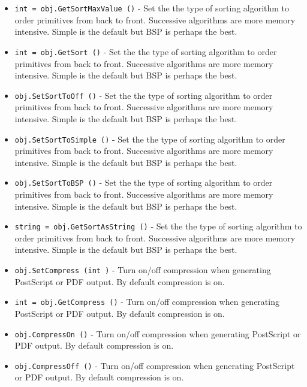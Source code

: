 \begin{itemize}
\item  \verb|int = obj.GetSortMaxValue ()| -  Set the the type of sorting algorithm to order primitives from
 back to front.  Successive algorithms are more memory
 intensive.  Simple is the default but BSP is perhaps the best.

\item  \verb|int = obj.GetSort ()| -  Set the the type of sorting algorithm to order primitives from
 back to front.  Successive algorithms are more memory
 intensive.  Simple is the default but BSP is perhaps the best.

\item  \verb|obj.SetSortToOff ()| -  Set the the type of sorting algorithm to order primitives from
 back to front.  Successive algorithms are more memory
 intensive.  Simple is the default but BSP is perhaps the best.

\item  \verb|obj.SetSortToSimple ()| -  Set the the type of sorting algorithm to order primitives from
 back to front.  Successive algorithms are more memory
 intensive.  Simple is the default but BSP is perhaps the best.

\item  \verb|obj.SetSortToBSP ()| -  Set the the type of sorting algorithm to order primitives from
 back to front.  Successive algorithms are more memory
 intensive.  Simple is the default but BSP is perhaps the best.

\item  \verb|string = obj.GetSortAsString ()| -  Set the the type of sorting algorithm to order primitives from
 back to front.  Successive algorithms are more memory
 intensive.  Simple is the default but BSP is perhaps the best.

\item  \verb|obj.SetCompress (int )| -  Turn on/off compression when generating PostScript or PDF
 output. By default compression is on.

\item  \verb|int = obj.GetCompress ()| -  Turn on/off compression when generating PostScript or PDF
 output. By default compression is on.

\item  \verb|obj.CompressOn ()| -  Turn on/off compression when generating PostScript or PDF
 output. By default compression is on.

\item  \verb|obj.CompressOff ()| -  Turn on/off compression when generating PostScript or PDF
 output. By default compression is on.


\end{itemize}
